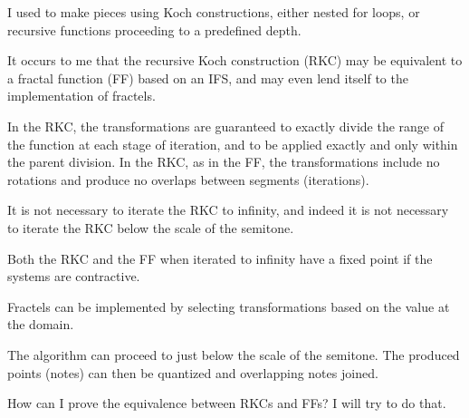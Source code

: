 \documentclass[english,11pt,letterpaper,onecolumn]{scrartcl}
\numberwithin{equation}{section}
\begin{document}
I used to make pieces using Koch constructions, either nested for loops, or recursive
functions proceeding to a predefined depth.

It occurs to me that the recursive Koch construction (RKC) may be equivalent to a
fractal function (FF) based on an IFS, and may even lend itself to the implementation
of fractels.

In the RKC, the transformations are guaranteed to exactly divide the range of the
function at each stage of iteration, and to be applied exactly and only within the
parent division. In the RKC, as in the FF, the transformations include no rotations and
produce no overlaps between segments (iterations).

It is not necessary to iterate the RKC to infinity, and indeed it is not necessary to
iterate the RKC below the scale of the semitone.

Both the RKC and the FF when iterated to infinity have a fixed point if the systems are
contractive.

Fractels can be implemented by selecting transformations based on the value at the domain.

The algorithm can proceed to just below the scale of the semitone. The produced points
(notes) can then be quantized and overlapping notes joined.

How can I prove the equivalence between RKCs and FFs? I will try to do that.

\printbibliography
\end{document}
